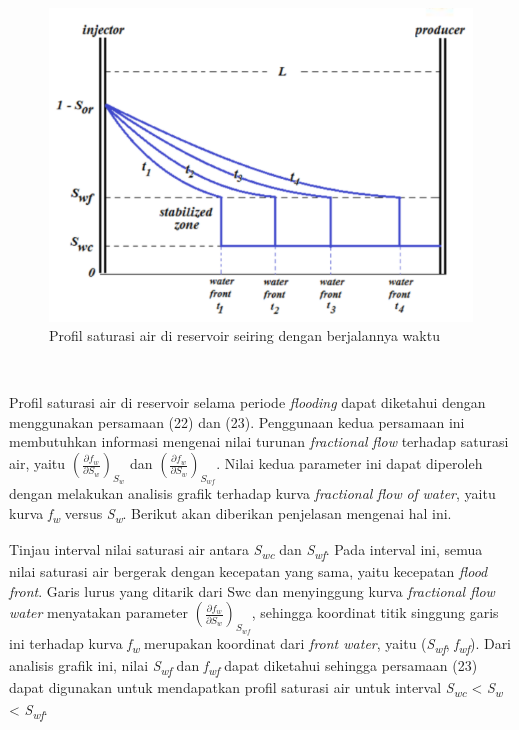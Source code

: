 \documentclass[
]{book}
\begin{document}
\begin{figure}

{\centering \includegraphics[width=0.5\linewidth]{images/waterflood/saturasiair2} 

}

\caption{Profil saturasi air di reservoir seiring dengan berjalannya waktu}\label{fig:unnamed-chunk-49}
\end{figure}

~

Profil saturasi air di reservoir selama periode \emph{flooding} dapat diketahui dengan menggunakan persamaan (22) dan (23). Penggunaan kedua persamaan ini membutuhkan informasi mengenai nilai turunan \emph{fractional} \emph{flow} terhadap saturasi air, yaitu \(\left( \frac{\partial f_w}{\partial S_w} \right)_{S_w}\) dan \(\left( \frac{\partial f_w}{\partial S_w} \right)_{S_{wf}}\). Nilai kedua parameter ini dapat diperoleh dengan melakukan analisis grafik terhadap kurva \emph{fractional} \emph{flow} \emph{of} \emph{water}, yaitu kurva \emph{f\textsubscript{w}} versus \emph{S\textsubscript{w}}. Berikut akan diberikan penjelasan mengenai hal ini.

Tinjau interval nilai saturasi air antara \emph{S\textsubscript{wc}} dan \emph{S\textsubscript{wf}}. Pada interval ini, semua nilai saturasi air bergerak dengan kecepatan yang sama, yaitu kecepatan \emph{flood front}. Garis lurus yang ditarik dari Swc dan menyinggung kurva \emph{fractional flow water} menyatakan parameter \(\left( \frac{\partial f_w}{\partial S_w} \right)_{S_{wf}}\), sehingga koordinat titik singgung garis ini terhadap kurva \emph{f\textsubscript{w}} merupakan koordinat dari \emph{front water}, yaitu (\emph{S\textsubscript{wf}}, \emph{f\textsubscript{wf}}). Dari analisis grafik ini, nilai \emph{S\textsubscript{wf}} dan \emph{f\textsubscript{wf}} dapat diketahui sehingga persamaan (23) dapat digunakan untuk mendapatkan profil saturasi air untuk interval \emph{S\textsubscript{wc}} \textless{} \emph{S\textsubscript{w}} \textless{} \emph{S\textsubscript{wf}}.
\end{document}
